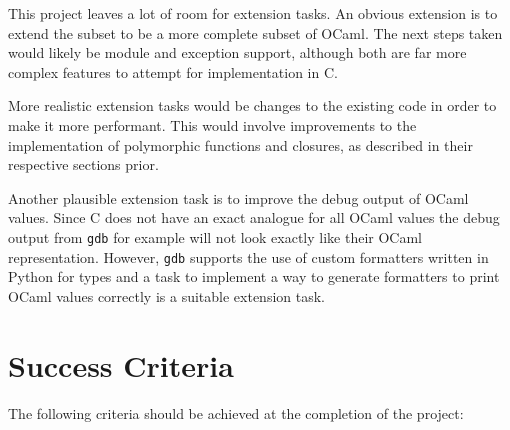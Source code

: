This project leaves a lot of room for extension tasks. An obvious extension is
to extend the subset to be a more complete subset of OCaml. The next steps
taken would likely be module and exception support, although both are far more
complex features to attempt for implementation in C.

More realistic extension tasks would be changes to the existing code in order
to make it more performant. This would involve improvements to the
implementation of polymorphic functions and closures, as described in their
respective sections prior.

Another plausible extension task is to improve the debug output of OCaml
values. Since C does not have an exact analogue for all OCaml values the debug
output from \texttt{gdb} for example will not look exactly like their OCaml
representation. However, \texttt{gdb} supports the use of custom formatters
written in Python for types and a task to implement a way to generate
formatters to print OCaml values correctly is a suitable extension task.

\section*{Success Criteria}

The following criteria should be achieved at the completion of the project:

